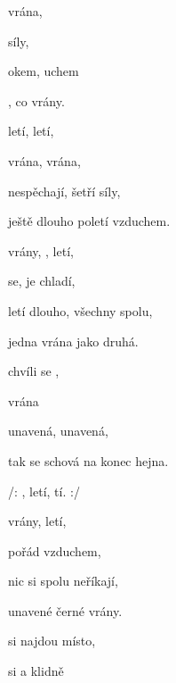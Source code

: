 

\zs
{} vrána, 

  síly,

 okem,  uchem

, co  vrány.
\ks

\zs
{} letí,  letí,

 vrána,  vrána,

nespěchají, šetří síly,

ještě dlouho poletí vzduchem.
\ks

\zs
{} vrány, , letí,

 se,  je chladí,

letí dlouho, všechny spolu,

jedna vrána jako druhá.
\ks

\zs
{} chvíli se ,

 vrána 

unavená, unavená,

tak se schová na konec hejna.
\ks

\zr
/: , letí, tí.   :/
\kr

\zs
{} vrány,  letí,

 pořád  vzduchem,

nic si spolu neříkají,

unavené černé vrány.
\ks

\zr
{} si najdou  místo,

 si a  klidně   
  
\kr

\kp
